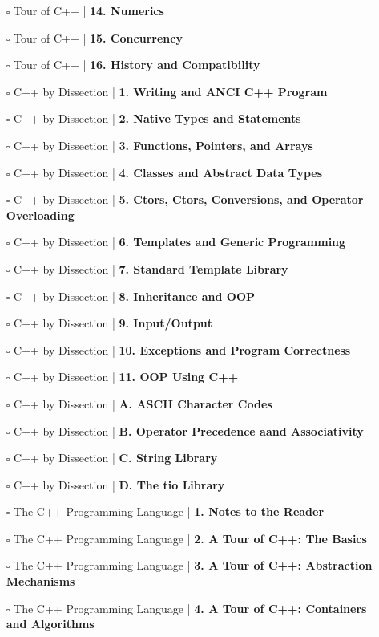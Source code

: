 \documentclass[a4, landscape, 12pt]{article}
\newcommand{\checkbox}{$\square$}%
\begin{document}
\begin{itemize}
{}
\item [\checkbox]  Tour of C++ | \textbf{ 14. Numerics
}
\item [\checkbox]  Tour of C++ | \textbf{ 15. Concurrency
}
\item [\checkbox]  Tour of C++ | \textbf{ 16. History and Compatibility
}
\item [\checkbox]  C++ by Dissection  | \textbf{ 1. Writing and ANCI C++ Program
}
\item [\checkbox]  C++ by Dissection  | \textbf{ 2. Native Types and Statements
}
\item [\checkbox]  C++ by Dissection  | \textbf{ 3. Functions, Pointers, and Arrays
}
\item [\checkbox]  C++ by Dissection  | \textbf{ 4. Classes and Abstract Data Types
}
\item [\checkbox]  C++ by Dissection  | \textbf{ 5. Ctors, Ctors, Conversions, and Operator Overloading
}
\item [\checkbox]  C++ by Dissection  | \textbf{ 6. Templates and Generic Programming
}
\item [\checkbox]  C++ by Dissection  | \textbf{ 7. Standard Template Library
}
\item [\checkbox]  C++ by Dissection  | \textbf{ 8. Inheritance and OOP
}
\item [\checkbox]  C++ by Dissection  | \textbf{ 9. Input/Output
}
\item [\checkbox]  C++ by Dissection  | \textbf{ 10. Exceptions and Program Correctness
}
\item [\checkbox]  C++ by Dissection  | \textbf{ 11. OOP Using C++
}
\item [\checkbox]  C++ by Dissection  | \textbf{ A. ASCII Character Codes
}
\item [\checkbox]  C++ by Dissection  | \textbf{ B. Operator Precedence aand Associativity
}
\item [\checkbox]  C++ by Dissection  | \textbf{ C. String Library
}
\item [\checkbox]  C++ by Dissection  | \textbf{ D. The tio Library
}
\item [\checkbox]  The C++ Programming Language | \textbf{ 1. Notes to the Reader
}
\item [\checkbox]  The C++ Programming Language | \textbf{ 2. A Tour of C++: The Basics
}
\item [\checkbox]  The C++ Programming Language | \textbf{ 3. A Tour of C++: Abstraction Mechanisms
}
\item [\checkbox]  The C++ Programming Language | \textbf{ 4. A Tour of C++: Containers and Algorithms
}
\end{itemize}
\end{document}
